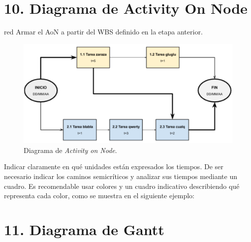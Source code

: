 \documentclass[
11pt, %
codirector, %
]{charter}
\begin{document}
\section{10. Diagrama de Activity On Node}
\label{sec:AoN}

\begin{consigna}{red}
Armar el AoN a partir del WBS definido en la etapa anterior. 



\end{consigna}

\begin{figure}[htpb]
\centering 
\includegraphics[width=.8\textwidth]{./Figuras/AoN.png}
\caption{Diagrama de \textit{Activity on Node}.}
\label{fig:AoN}
\end{figure}

Indicar claramente en qué unidades están expresados los tiempos.
De ser necesario indicar los caminos semicríticos y analizar sus tiempos mediante un cuadro.
Es recomendable usar colores y un cuadro indicativo describiendo qué representa cada color, como se muestra en el siguiente ejemplo:



\section{11. Diagrama de Gantt}
\label{sec:gantt}
\end{document}
